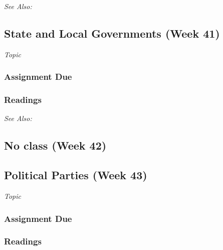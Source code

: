 \documentclass[12pt,a4paper]{article}
\newcommand{\seealso}{\noindent \emph{See Also:}\\}
\begin{document}

\seealso



\clearpage
\subsection{State and Local Governments (Week 41)}
\emph{Topic}
\vspace{1em}
\subsubsection*{Assignment Due}

\subsubsection*{Readings}



\seealso


\clearpage
\subsection{No class (Week 42)}

\clearpage
\subsection{Political Parties (Week 43)}
\emph{Topic}
\vspace{1em}

\subsubsection*{Assignment Due}

\subsubsection*{Readings}
\end{document}
